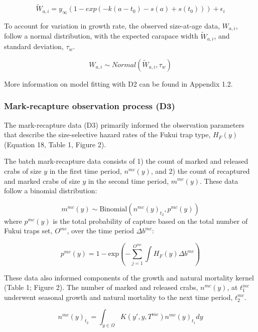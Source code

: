 \documentclass{article}
\begin{document}
\begin{equation}
\widetilde{W}_{a,i} = y_{\infty}(1-exp(-k(a-t_0) - s(a) + s(t_0))) + \epsilon_i
\end{equation}

To account for variation in growth rate, the observed size-at-age data, $W_{a,i}$, follow a normal distribution, with the expected carapace width $\widetilde{W}_{a,i}$, and standard deviation, $\tau_{w}$.

\begin{equation}
W_{a,i} \sim Normal(\widetilde{W}_{a,i}, \tau_{w})
\end{equation}

More information on model fitting with D2 can be found in Appendix 1.2.

\subsubsection*{Mark-recapture observation process (D3)}

The mark-recapture data (D3) primarily informed the observation parameters that describe the size-selective hazard rates of the Fukui trap type, $H_F(y)$ (Equation 18, Table 1, Figure 2).

The batch mark-recapture data consists of 1) the count of marked and released crabs of size $y$ in the first time period, $n^{mc}(y)$, and 2) the count of recaptured and marked crabs of size $y$ in the second time period, $m^{mc}(y)$. These data follow a binomial distribution:

\begin{equation}
m^{mc}(y) \sim \text{Binomial}(n^{mc}(y)_{t_2}, p^{mc}(y)) 
\end{equation}
where $p^{mc}(y)$ is the total probability of capture based on the total number of Fukui traps set, $O^{mc}$, over the time period $\Delta b^{mc}$:

\begin{equation}
p^{mc}(y) = 1-\text{exp}\left(-\sum_{j=1}^{O^{mc}}\int H_F(y)\Delta b^{mc}\right)
\end{equation}

These data also informed components of the growth and natural mortality kernel (Table 1; Figure 2). The number of marked and released crabs, $n^{mc}(y)$, at $t_1^{mc}$ underwent seasonal growth and natural mortality to the next time period, $t_2^{mc}$.

\begin{equation}
n^{mc}(y)_{t{_2}} = \int_{y \in \Omega} K(y',y, T^{mc}) n^{mc}(y)_{t_1}dy
\end{equation}
\end{document}
